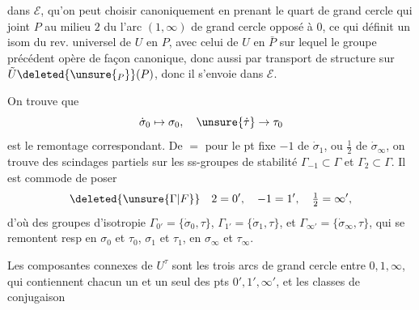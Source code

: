 dans $\mathcal E$, qu'on peut choisir canoniquement en prenant le quart de grand cercle qui joint $P$ au milieu $2$ du  l'arc $(1,\infty)$ de grand cercle opposé à $0$, ce qui définit un isom du rev. universel de $U$ en $P$, avec celui de $U$ en $\bar P$ sur lequel le groupe précédent opère de façon canonique, donc aussi par transport de structure sur $\tilde U\deleted{\unsure{_P}}(P)$, donc il s'envoie dans $\mathcal E$.

On trouve que
\[
\dot\sigma_0\mapsto\sigma_0,\quad\unsure{\dot\tau}\to\tau_0
\]
est le remontage correspondant. De $=$ pour le pt fixe $-1$ de $\dot\sigma_1$, ou $\frac12$ de $\dot\sigma_\infty$, on trouve des scindages partiels sur les ss-groupes de  stabilité $\Gamma_{-1}\subset\Gamma$ et $\Gamma_2\subset\Gamma$. Il est commode de poser
\[
\deleted{\unsure{\Gamma|F}}\quad 2=0',\quad -1=1',\quad \tfrac12=\infty',
\]
d'où des groupes d'isotropie $\Gamma_{0'}=\{\dot\sigma_0,\tau\}$, $\Gamma_{1'}=\{\dot\sigma_1,\tau\}$, et $\Gamma_{\infty'}=\{\dot\sigma_\infty,\tau\}$, qui se remontent resp en $\sigma_0$ et $\tau_0$,  $\sigma_1$ et $\tau_1$, en $\sigma_\infty$ et $\tau_\infty$.

Les composantes connexes de $U^\tau$ sont les trois arcs de grand cercle entre $0,1,\infty$, qui contiennent chacun un  et un seul des pts $0',1',\infty'$, et les classes de conjugaison
